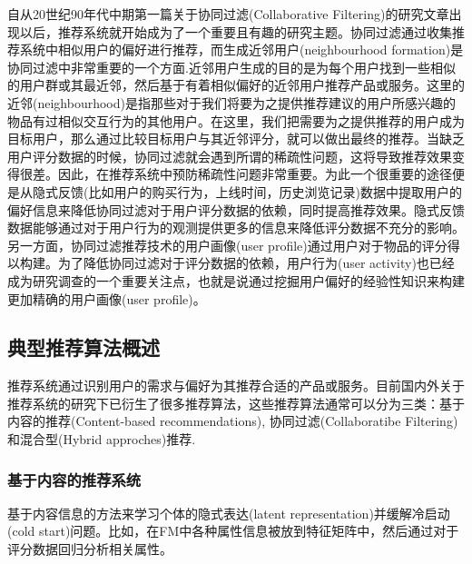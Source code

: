 自从20世纪90年代中期第一篇关于协同过滤(Collaborative Filtering)的研究文章\cite{DBLP:conf/cscw/ResnickISBR94}出现以后，推荐系统就开始成为了一个重要且有趣的研究主题。协同过滤通过收集推荐系统中相似用户的偏好进行推荐，而生成近邻用户(neighbourhood formation)是协同过滤中非常重要的一个方面\cite{DBLP:journals/isci/KardanE13,DBLP:conf/icic/LeePP07}.近邻用户生成的目的是为每个用户找到一些相似的用户群或其最近邻，然后基于有着相似偏好的近邻用户推荐产品或服务\cite{DBLP:journals/eswa/ZhengL11,DBLP:journals/ecra/ChoiYKS12}。这里的近邻(neighbourhood)是指那些对于我们将要为之提供推荐建议的用户所感兴趣的物品有过相似交互行为的其他用户。在这里，我们把需要为之提供推荐的用户成为目标用户，那么通过比较目标用户与其近邻评分，就可以做出最终的推荐\cite{DBLP:journals/eswa/AcilarA09,kim2011recommender}。当缺乏用户评分数据的时候，协同过滤就会遇到所谓的稀疏性问题，这将导致推荐效果变得很差。因此，在推荐系统中预防稀疏性问题非常重要。为此一个很重要的途径便是从隐式反馈(比如用户的购买行为，上线时间，历史浏览记录)数据中提取用户的偏好信息来降低协同过滤对于用户评分数据的依赖，同时提高推荐效果\cite{DBLP:conf/icdm/HuKV08,DBLP:journals/eswa/AlbadviS09}。隐式反馈数据能够通过对于用户行为的观测提供更多的信息来降低评分数据不充分的影响\cite{rafeh2012adaptive,DBLP:journals/eswa/ZhengL11}。另一方面，协同过滤推荐技术的用户画像(user profile)通过用户对于物品的评分得以构建。为了降低协同过滤对于评分数据的依赖，用户行为(user activity)也已经成为研究调查的一个重要关注点，也就是说通过挖掘用户偏好的经验性知识来构建更加精确的用户画像(user profile)\cite{lee2010collaborative,DBLP:journals/eswa/ZhengL11,kim2011recommender,DBLP:journals/ecra/ChoiYKS12}。




\subsection{典型推荐算法概述}

推荐系统通过识别用户的需求与偏好为其推荐合适的产品或服务。目前国内外关于推荐系统的研究下已衍生了很多推荐算法，这些推荐算法通常可以分为三类：基于内容的推荐(Content-based recommendations), 协同过滤(Collaboratibe Filtering)和混合型(Hybrid approches)推荐.
 
 
\subsubsection{基于内容的推荐系统}

基于内容信息的方法\cite{gantner2010learning,rendle2012factorization,hong2013co}来学习个体的隐式表达(latent representation)并缓解冷启动(cold start)问题。比如，在FM\cite{rendle2012factorization}中各种属性信息被放到特征矩阵中，然后通过对于评分数据回归分析相关属性。

